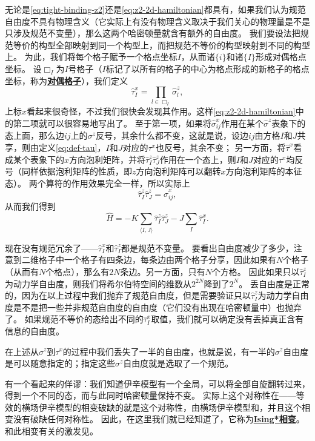 \documentclass[hyperref, UTF8, a4paper]{ctexart}
\newcommand*{\pair}[1]{\langle #1 \rangle}
\renewcommand{\autoref}{\prettyref}
\newcommand*{\concept}[1]{\underline{\textbf{#1}}}
\newcommand*{\Ztwo}{$\mathbb{Z}_2$}
\begin{document}
无论是\eqref{eq:tight-binding-z2}还是\eqref{eq:z2-2d-hamiltonian}都具有，如果我们认为规范自由度不具有物理含义（它实际上有没有物理含义取决于我们关心的物理量是不是只涉及规范不变量），那么这两个哈密顿量就含有额外的自由度。
我们要设法把规范等价的构型全部映射到同一个构型上，而把规范不等价的构型映射到不同的构型上。
为此，我们将每个格子赋予一个格点坐标$I$，从而诸$\{i\}$和诸$\{I\}$形成对偶格点坐标。
设$\Box_I$为$I$号格子（$I$标记了以所有的格子的中心为格点形成的新格子的格点坐标，称为\concept{对偶格子}），我们定义
\begin{equation}
    \hat{\tau}^x_I = \prod_{l \in \Box_I} \hat{\sigma}^z_l,
    \label{eq:def-tau}
\end{equation}
上标$x$看起来很奇怪，不过我们很快会发现其作用。这样\eqref{eq:z2-2d-hamiltonian}中的第二项就可以很容易地写出了。
至于第一项，如果将$\hat{\sigma}_{ij}^x$作用在某个$\hat{\sigma}^z$表象下的态上面，那么边$ij$上的$\sigma^z$反号，其余什么都不变，这就是说，设边$ij$由方格$I$和$J$共享，则由定义\eqref{eq:def-tau}，$I$和$J$对应的$\tau^x$也反号，其余不变；
另一方面，将$\hat{\tau}^x$看成某个表象下的$x$方向泡利矩阵，并将$\hat{\tau}^z_I \hat{\tau}^z_J$作用在一个态上，则$I$和$J$对应的$\tau^x$均反号（同样依据泡利矩阵的性质，即$z$方向泡利矩阵可以翻转$x$方向泡利矩阵的本征态）。
两个算符的作用效果完全一样，所以实际上
\[
    \hat{\tau}^z_I \hat{\tau}^z_J = \hat{\sigma}^x_{ij},
\]
从而我们得到
\begin{equation}
    \hat{H} = - K \sum_{\pair{I, J}} \hat{\tau}^z_I \hat{\tau}^z_J - J \sum_{I} \hat{\tau}^x_I.
    \label{eq:z2-2d-tau-hamiltonian}
\end{equation}

现在没有规范冗余了——$\hat{\tau}^x_{I}$和$\hat{\tau}^z_I$都是规范不变量。
要看出自由度减少了多少，注意到二维格子中一个格子有四条边，每条边由两个格子分享，因此如果有$N$个格子（从而有$N$个格点），那么有$2N$条边。另一方面，只有$N$个方格。
因此如果只以$\hat{\tau}^z_I$为动力学自由度，则我们将希尔伯特空间的维数从$2^{2N}$降到了$2^N$。
丢自由度是正常的，因为在以上过程中我们抛弃了规范自由度，但是需要验证只以$\hat{\tau}^z_I$为动力学自由度是不是把一些并非规范自由度的自由度（它们没有出现在哈密顿量中）也抛弃了。
如果规范不等价的态给出不同的$\hat{\tau}^x_I$取值，我们就可以确定没有丢掉真正含有信息的自由度。

在上述从$\sigma^z$到$\tau^x$的过程中我们丢失了一半的自由度，也就是说，有一半的$\sigma^z$自由度是可以随意指定的；指定这些$\sigma^z$自由度就是选取了一个规范。

有一个看起来的佯谬：我们知道伊辛模型有一个全局，可以将全部自旋翻转过来，得到一个不同的态，而与此同时哈密顿量保持不变。
实际上这个对称性在——等效的横场伊辛模型的相变破缺的就是这个对称性，由横场伊辛模型和，并且这个相变没有破缺任何对称性。
因此，在这里我们就已经知道了，它称为\concept{Ising*相变}。
和此相变有关的激发见\autoref{sec:z2-topo-excitation}。
\end{document}
